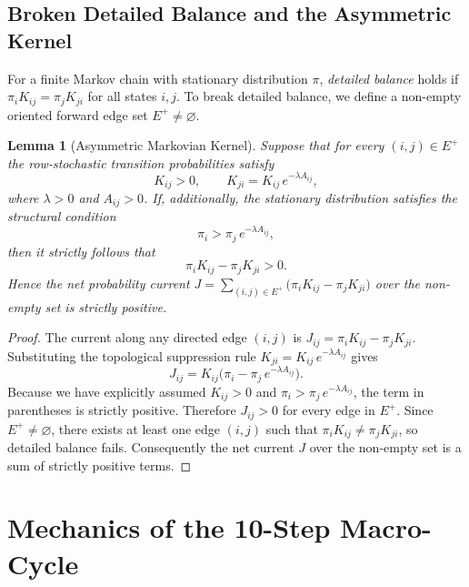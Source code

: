\documentclass[11pt]{article}
\theoremstyle{plain}
\newtheorem{lemma}{Lemma}[section]
\theoremstyle{definition}
\newcommand{\Efwd}{E^{+}}
\begin{document}
\subsection{Broken Detailed Balance and the Asymmetric Kernel}
For a finite Markov chain with stationary distribution $\pi$, \emph{detailed
balance} holds if $\pi_i K_{ij} = \pi_j K_{ji}$ for all states $i,j$. To break
detailed balance, we define a non-empty oriented forward edge set
$\Efwd \neq \varnothing$.

\begin{lemma}[Asymmetric Markovian Kernel]\label{lem:asym}
Suppose that for every $(i,j)\in\Efwd$ the row-stochastic transition
probabilities satisfy
\[
  K_{ij} > 0, \qquad K_{ji} = K_{ij}\, e^{-\lambda A_{ij}},
\]
where $\lambda > 0$ and $A_{ij} > 0$. If, additionally, the stationary
distribution satisfies the structural condition
\[
  \pi_i > \pi_j\, e^{-\lambda A_{ij}},
\]
then it strictly follows that
\[
  \pi_i K_{ij} - \pi_j K_{ji} > 0.
\]
Hence the net probability current
$J = \sum_{(i,j)\in\Efwd}\bigl(\pi_i K_{ij} - \pi_j K_{ji}\bigr)$ over the
non-empty set is strictly positive.
\end{lemma}

\begin{proof}
The current along any directed edge $(i,j)$ is
$J_{ij} = \pi_i K_{ij} - \pi_j K_{ji}$. Substituting the topological suppression
rule $K_{ji} = K_{ij}\, e^{-\lambda A_{ij}}$ gives
\[
  J_{ij} = K_{ij}\bigl(\pi_i - \pi_j\, e^{-\lambda A_{ij}}\bigr).
\]
Because we have explicitly assumed $K_{ij} > 0$ and
$\pi_i > \pi_j\, e^{-\lambda A_{ij}}$, the term in parentheses is strictly
positive. Therefore $J_{ij} > 0$ for every edge in $\Efwd$. Since
$\Efwd \neq \varnothing$, there exists at least one edge $(i,j)$ such that
$\pi_i K_{ij} \neq \pi_j K_{ji}$, so detailed balance fails. Consequently the
net current $J$ over the non-empty set is a sum of strictly positive terms.
\end{proof}

\section{Mechanics of the 10-Step Macro-Cycle}
\end{document}
